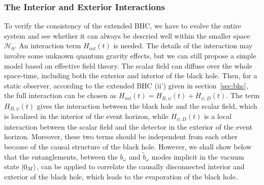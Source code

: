\documentclass[12pt,a4paper]{article}
\begin{document}
\subsubsection{The Interior and Exterior Interactions}
\label{sec:interaction}


To verify the consistency of the extended BHC, we have to evolve the entire
system and see whether it can always be descried well within the
smaller space $\mathcal {H}_0$. An interaction term $H_{int}(t)$
is needed. The details of the interaction may involve some unknown quantum gravity effects, but we
can still propose a simple model based on effective field theory. The scalar field can diffuse over the whole space-time, including both the exterior and interior of the black hole. Then, for a static observer, according to the extended BHC (ii') given in section~\ref{sec:bhc}, the full interaction can be chosen as $H_{int}(t)=H_{B,\psi}(t)+H_{\psi,D}(t)$. The term $H_{B,\psi}(t)$ gives the interaction between the black hole and the scalar field, which is localized in the interior of the event horizon, while $H_{\psi,D}(t)$ is a local interaction between the scalar field and the detector in the exterior of the event horizon. Moreover, these two terms should be independent from each other because of the causal structure of the black hole. However, we shall show below that the entanglements, between the $b_{\omega}$ and $\tilde{b}_{\omega}$ modes implicit in the vacuum state $\arrowvert0_{M}\rangle$, can be applied to correlate the causally disconnected interior and exterior of the black hole, which leads to the evaporation of the black hole.
\end{document}

